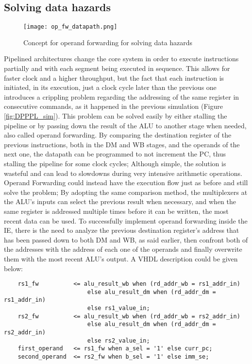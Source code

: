 \subsection{Solving data hazards}
\begin{figure}[!ht]
    \centering
    \texttt{[image: op\_fw\_datapath.png]}
    \caption{Concept for operand forwarding for solving data hazards}
    \label{fig:op_fw}
\end{figure}

Pipelined architectures change the core system in order to execute instructions partially and with each segment being executed in sequence. This allows for faster clock and a higher throughput, but the fact that each instruction is initiated, in its execution, just a clock cycle later than the previous one introduces a crippling problem regarding the addressing of the same register in consecutive commands, as it happened in the previous simulation (Figure \ref{fig:DPPPL_sim}). This problem can be solved easily by either stalling the pipeline or by passing down the result of the ALU to another stage when needed, also called operand forwarding.
By comparing the destination register of the previous instructions, both in the DM and WB stages, and the operands of the next one, the datapath can be programmed to not increment the PC, thus stalling the pipeline for some clock cycles; Although simple, the solution is wasteful and can lead to slowdowns during very intensive arithmetic operations.
Operand Forwarding could instead have the execution flow just as before and still solve the problem; By adopting the same comparison method, the multiplexers at the ALU's inputs can select the previous result when necessary, and when the same register is addressed multiple times before it can be written, the most recent data can be used.
To successfully implement operand forwarding inside the IE, there is the need to analyze the previous destination register's address that has been passed down to both DM and WB, as said earlier, then confront both of the addresses with the address of each one of the operands and finally overwrite them with the most recent ALU's output. A VHDL description could be given below:

\begin{verbatim}
    rs1_fw          <= alu_result_wb when (rd_addr_wb = rs1_addr_in) 
                        else alu_result_dm when (rd_addr_dm = rs1_addr_in)
                        else rs1_value_in;
    rs2_fw          <= alu_result_wb when (rd_addr_wb = rs2_addr_in)
                        else alu_result_dm when (rd_addr_dm = rs2_addr_in) 
                        else rs2_value_in;
    first_operand   <= rs1_fw when a_sel = '1' else curr_pc;
    second_operand  <= rs2_fw when b_sel = '1' else imm_se;
\end{verbatim}

